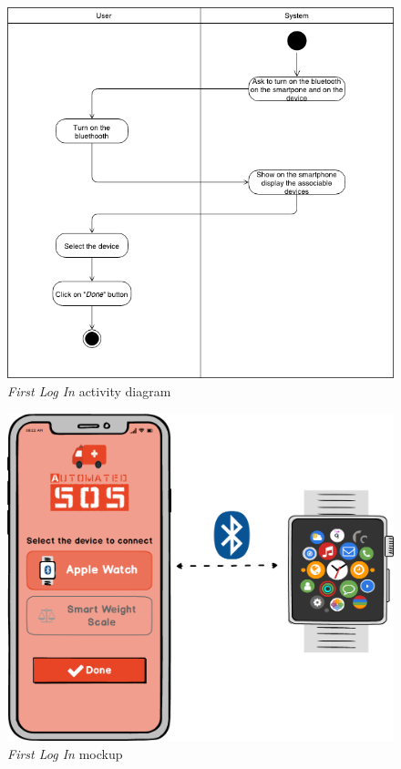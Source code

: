 \begin{figure}
\begin{center}
  \includegraphics[width=\textwidth]{img/activity/FirstIndividualLogin.png}
  \hspace{0.05\linewidth}
  \centering
  \caption{\textit{First Log In} activity diagram}
  \label{img:firstIndividualLoginActivityDiagram}
\end{center}
\end{figure}

\begin{figure}
\begin{center}
  \includegraphics[width=\textwidth]{img/mockup/First_Login.png}
  \hspace{0.05\linewidth}
  \centering
  \caption{\textit{First Log In} mockup}
  \label{img:firstLogInMockup}
\end{center}
\end{figure}
